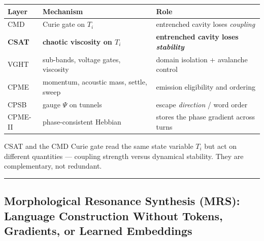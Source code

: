 \documentclass[
  11pt,
  a4paper,
]{article}
\begin{document}
\begin{longtable}[]{@{}
  >{\raggedright\arraybackslash}p{}
  >{\raggedright\arraybackslash}p{}
  >{\raggedright\arraybackslash}p{}@{}}
\toprule\noalign{}
\begin{minipage}[b]{\linewidth}\raggedright
Layer
\end{minipage} & \begin{minipage}[b]{\linewidth}\raggedright
Mechanism
\end{minipage} & \begin{minipage}[b]{\linewidth}\raggedright
Role
\end{minipage} \\
\midrule\noalign{}
\endhead
\bottomrule\noalign{}
\endlastfoot
CMD & Curie gate on \(T_i\) & entrenched cavity loses \emph{coupling} \\
\textbf{CSAT} & \textbf{chaotic viscosity on \(T_i\)} &
\textbf{entrenched cavity loses \emph{stability}} \\
VGHT & sub-bands, voltage gates, viscosity & domain isolation +
avalanche control \\
CPME & momentum, acoustic mass, settle, sweep & emission eligibility and
ordering \\
CPSB & gauge \(\Psi\) on tunnels & escape \emph{direction} / word
order \\
CPME-II & phase-consistent Hebbian & stores the phase gradient across
turns \\
\end{longtable}

CSAT and the CMD Curie gate read the same state variable \(T_i\) but act
on different quantities --- coupling strength versus dynamical
stability. They are complementary, not redundant.

\begin{center}\rule{0.5\linewidth}{0.5pt}\end{center}

\newpage

\subsection{Morphological Resonance Synthesis (MRS): Language
Construction Without Tokens, Gradients, or Learned
Embeddings}\label{morphological-resonance-synthesis-mrs-language-construction-without-tokens-gradients-or-learned-embeddings}
\end{document}
